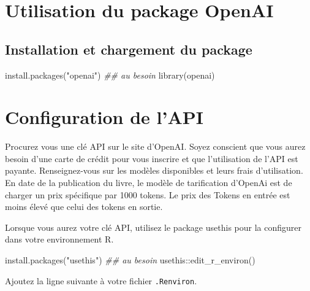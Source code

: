 \documentclass[
  letterpaper,
]{scrbook}
\newenvironment{Shaded}{\begin{snugshade}}{\end{snugshade}}
\newcommand{\DocumentationTok}[1]{\textcolor[rgb]{0.37,0.37,0.37}{\textit{#1}}}
\newcommand{\FunctionTok}[1]{\textcolor[rgb]{0.28,0.35,0.67}{#1}}
\newcommand{\NormalTok}[1]{\textcolor[rgb]{0.00,0.23,0.31}{#1}}
\newcommand{\SpecialCharTok}[1]{\textcolor[rgb]{0.37,0.37,0.37}{#1}}
\newcommand{\StringTok}[1]{\textcolor[rgb]{0.13,0.47,0.30}{#1}}
\begin{document}
\hypertarget{utilisation-du-package-openai}{%
\section{Utilisation du package
OpenAI}\label{utilisation-du-package-openai}}

\hypertarget{installation-et-chargement-du-package}{%
\subsection{Installation et chargement du
package}\label{installation-et-chargement-du-package}}

\begin{Shaded}
\begin{Highlighting}[]
\FunctionTok{install.packages}\NormalTok{(}\StringTok{"openai"}\NormalTok{) }\DocumentationTok{\#\# au besoin}
\FunctionTok{library}\NormalTok{(openai)}
\end{Highlighting}
\end{Shaded}

\hypertarget{configuration-de-lapi}{%
\section{Configuration de l'API}\label{configuration-de-lapi}}

Procurez vous une clé API sur le site d'OpenAI. Soyez conscient que vous
aurez besoin d'une carte de crédit pour vous inscrire et que
l'utilisation de l'API est payante. Renseignez-vous sur les modèles
disponibles et leurs frais d'utilisation. En date de la publication du
livre, le modèle de tarification d'OpenAi est de charger un prix
spécifique par 1000 tokens. Le prix des Tokens en entrée est moins élevé
que celui des tokens en sortie.

Lorsque vous aurez votre clé API, utilisez le package usethis pour la
configurer dans votre environnement R.

\begin{Shaded}
\begin{Highlighting}[]
\FunctionTok{install.packages}\NormalTok{(}\StringTok{"usethis"}\NormalTok{) }\DocumentationTok{\#\# au besoin}
\NormalTok{usethis}\SpecialCharTok{::}\FunctionTok{edit\_r\_environ}\NormalTok{()}
\end{Highlighting}
\end{Shaded}

Ajoutez la ligne suivante à votre fichier \texttt{.Renviron}.
\end{document}
